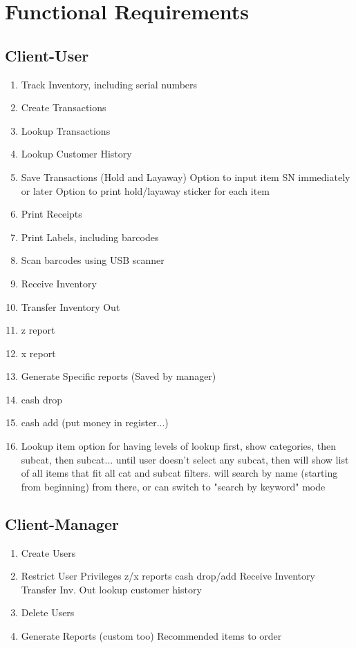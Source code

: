 \chapter{Functional Requirements}
\label{01_FuncReqs}

\section{Client-User}
\begin{enumerate}
	\item Track Inventory, including serial numbers
	\item Create Transactions
	\item Lookup Transactions
	\item Lookup Customer History
	\item Save Transactions (Hold and Layaway)
		\subitem Option to input item SN immediately or later
		\subitem Option to print hold/layaway sticker for each item
	\item Print Receipts
	\item Print Labels, including barcodes
	\item Scan barcodes using USB scanner
	\item Receive Inventory
	\item Transfer Inventory Out
	\item z report
	\item x report
	\item Generate Specific reports (Saved by manager)
	\item cash drop
	\item cash add (put money in register...)
	\item Lookup item
		\subitem option for having levels of lookup
		\subitem first, show categories, then subcat, then subcat... until user doesn't select any subcat, then will show list of all items that fit all cat and subcat filters. will search by name (starting from beginning) from there, or can switch to "search by keyword" mode
\end{enumerate}

\section{Client-Manager}
\begin{enumerate}
	\item Create Users
	\item Restrict User Privileges
		\subitem z/x reports
		\subitem cash drop/add
		\subitem Receive Inventory
		\subitem Transfer Inv. Out
		\subitem lookup customer history
		\subitem 
	\item Delete Users
	\item Generate Reports (custom too)
		\subitem Recommended items to order
\end{enumerate}

